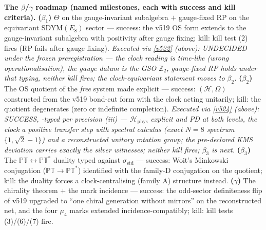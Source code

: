 \documentclass[11pt,a4paper]{article}
\newcommand{\Z}{\mathbb Z}
\begin{document}
\par\smallskip\noindent\textbf{The $\beta$/$\gamma$ roadmap (named milestones, each with success
and kill criteria).}
\textbf{($\beta_1$)} $\Theta$ on the gauge-invariant subalgebra $+$ gauge-fixed RP on the
equivariant SDYM$(E_8)$ sector --- success: the v519 OS form extends to the gauge-invariant
subalgebra with positivity after gauge fixing; kill: kill test (2) fires (RP fails after gauge
fixing). \emph{Executed via \vref{v522} (above): UNDECIDED under the frozen preregistration ---
the clock reading is time-like (wrong operationalisation), the gauge datum is the GSO $\Z_2$,
gauge-fixed RP holds under that typing, neither kill fires; the clock-equivariant statement
moves to $\beta_2$.}
\textbf{($\beta_2$)} The OS quotient of the \emph{free} system made explicit --- success:
$(\mathcal H,\Omega)$ constructed from the v519 bond-cut form with the clock acting unitarily;
kill: the quotient degenerates (zero or indefinite completion). \emph{Executed via
\vref{v524} (above): SUCCESS, \mC-typed per precision (iii) --- $\mathcal H_{\mathrm{phys}}$
explicit and PD at both levels, the clock a positive transfer step with spectral calculus
(exact $N = 8$ spectrum $\{1, \sqrt2-1\}$) and a reconstructed unitary rotation group; the
pre-declared KMS deviation carries exactly the silver witnesses; neither kill fires;
$\beta_3$ is next.}
\textbf{($\beta_3$)} The $\mathbb{PT}\leftrightarrow\mathbb{PT}^*$ duality typed against
$\sigma_{\mathrm{std}}$ --- success: Woit's Minkowski conjugation ($\mathbb{PT}\to\mathbb{PT}^*$)
identified with the family-D conjugation on the quotient; kill: the duality forces a
clock-centralising (family A) structure instead.
\textbf{($\gamma$)} The chirality theorem $+$ the mark incidence --- success: the odd-sector
definiteness flip of v519 upgraded to ``one chiral generation without mirrors'' on the
reconstructed net, and the four $\mu_4$ marks extended incidence-compatibly; kill: kill tests
(3)/(6)/(7) fire.
\end{document}
